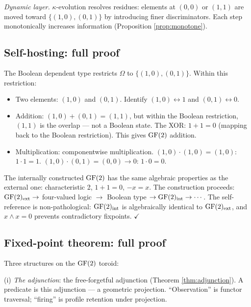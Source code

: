 \emph{Dynamic layer.}
$\kappa$-evolution resolves residues: elements at
$(0,0)$ or $(1,1)$ are moved toward $\{(1,0), (0,1)\}$
by introducing finer discriminators. Each step
monotonically increases information (Proposition
\ref{prop:monotone}).

\subsection{Self-hosting: full proof}
\label{app:self-hosting-full}

The Boolean dependent type restricts $\Omega$ to
$\{(1,0), (0,1)\}$. Within this restriction:
\begin{itemize}[nosep]
  \item Two elements: $(1,0)$ and $(0,1)$. Identify
    $(1,0) \leftrightarrow 1$ and $(0,1) \leftrightarrow 0$.
  \item Addition: $(1,0) + (0,1) = (1,1)$, but within the
    Boolean restriction, $(1,1)$ is the overlap --- not a
    Boolean state. The XOR: $1 + 1 = 0$ (mapping back to
    the Boolean restriction). This gives $\operatorname{GF}(2)$ addition.
  \item Multiplication: componentwise multiplication.
    $(1,0) \cdot (1,0) = (1,0)$: $1 \cdot 1 = 1$.
    $(1,0) \cdot (0,1) = (0,0) \to 0$: $1 \cdot 0 = 0$.
\end{itemize}

The internally constructed $\operatorname{GF}(2)$ has the same algebraic
properties as the external one: characteristic 2,
$1 + 1 = 0$, $-x = x$. The construction proceeds:
$\operatorname{GF}(2)_{\mathrm{ext}} \to$ four-valued logic $\to$
Boolean type $\to \operatorname{GF}(2)_{\mathrm{int}} \to \cdots$.
The self-reference is non-pathological:
$\operatorname{GF}(2)_{\mathrm{int}}$ is algebraically identical to
$\operatorname{GF}(2)_{\mathrm{ext}}$, and $x \wedge x = 0$ prevents
contradictory fixpoints. $\checkmark$

\subsection{Fixed-point theorem: full proof}
\label{app:fixed-point-full}

Three structures on the $\operatorname{GF}(2)$ toroid:

(i) \emph{The adjunction}: the free-forgetful adjunction
(Theorem \ref{thm:adjunction}). A predicate is this
adjunction --- a geometric projection. ``Observation'' is
functor traversal; ``firing'' is profile retention under
projection.

